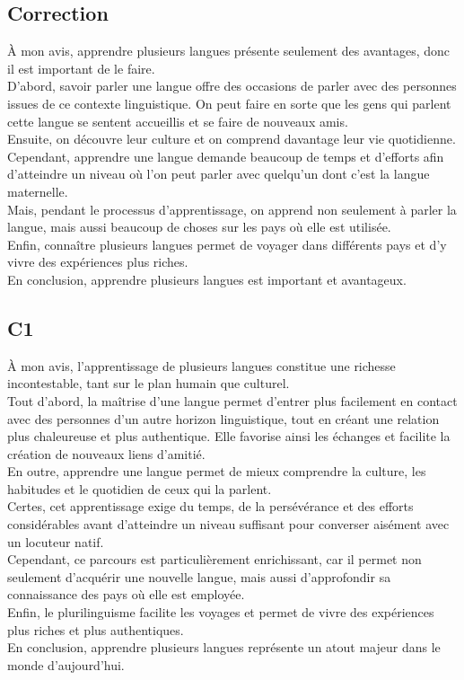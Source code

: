 \documentclass{book}
\begin{document}
    \subsection{Correction}
        À mon avis, apprendre plusieurs langues présente seulement des avantages, donc il est important de le faire.
        \\
        D'abord, savoir parler une langue offre des occasions de parler avec des personnes issues de ce contexte linguistique.
        On peut faire en sorte que les gens qui parlent cette langue se sentent accueillis et se faire de nouveaux amis.
        \\
        Ensuite, on découvre leur culture et on comprend davantage leur vie quotidienne.
        \\
        Cependant, apprendre une langue demande beaucoup de temps et d'efforts afin d'atteindre un niveau où l'on peut parler avec quelqu'un dont c'est la langue maternelle.
        \\
        Mais, pendant le processus d'apprentissage, on apprend non seulement à parler la langue, mais aussi beaucoup de choses sur les pays où elle est utilisée.
        \\
        Enfin, connaître plusieurs langues permet de voyager dans différents pays et d'y vivre des expériences plus riches.
        \\
        En conclusion, apprendre plusieurs langues est important et avantageux.

    \subsection{C1}
        À mon avis, l'apprentissage de plusieurs langues constitue une richesse incontestable, tant sur le plan humain que culturel.
        \\
        Tout d'abord, la maîtrise d'une langue permet d'entrer plus facilement en contact avec des personnes d'un autre horizon linguistique,
        tout en créant une relation plus chaleureuse et plus authentique.
        Elle favorise ainsi les échanges et facilite la création de nouveaux liens d'amitié.
        \\
        En outre, apprendre une langue permet de mieux comprendre la culture, les habitudes et le quotidien de ceux qui la parlent.
        \\
        Certes, cet apprentissage exige du temps, de la persévérance et des efforts considérables avant d'atteindre un niveau suffisant pour converser aisément avec un locuteur natif.
        \\
        Cependant, ce parcours est particulièrement enrichissant, car il permet non seulement d'acquérir une nouvelle langue, mais aussi d'approfondir sa connaissance des pays où elle est employée.
        \\
        Enfin, le plurilinguisme facilite les voyages et permet de vivre des expériences plus riches et plus authentiques.
        \\
        En conclusion, apprendre plusieurs langues représente un atout majeur dans le monde d'aujourd'hui.
        
\end{document}
